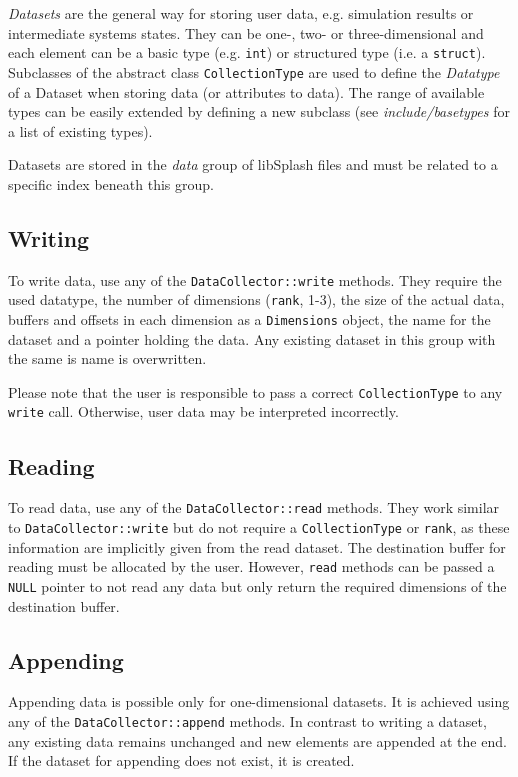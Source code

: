 \documentclass[a4paper,10pt,BCOR12mm]{report}
\begin{document}
\emph{Datasets} are the general way for storing user data, e.g. simulation results or intermediate
systems states. They can be one-, two- or three-dimensional and each element can be
a basic type (e.g. \texttt{int}) or structured type (i.e. a \texttt{struct}).
Subclasses of the abstract class \texttt{CollectionType} are used to define the
\emph{Datatype} of a Dataset when storing data (or attributes to data).
The range of available types can be easily extended by defining a new subclass
(see \emph{include/basetypes} for a list of existing types).

Datasets are stored in the \emph{data} group of libSplash files and must be
related to a specific index beneath this group.

\subsection{Writing}
\label{lab:sdc:write}

To write data, use any of the \texttt{DataCollector::write} methods.
They require the used datatype, the number
of dimensions (\texttt{rank}, 1-3), the size of the actual data, buffers and offsets in
each dimension as a \texttt{Dimensions} object, the name for the dataset and a pointer
holding the data.
Any existing dataset in this group with the same is name is overwritten.

Please note that the user is responsible to pass a correct \texttt{CollectionType} to
any \texttt{write} call. Otherwise, user data may be interpreted incorrectly.

\subsection{Reading}

To read data, use any of the \texttt{DataCollector::read} methods.
They work similar to \texttt{DataCollector::write} but do not require
a \texttt{CollectionType} or \texttt{rank}, as these information are implicitly given from
the read dataset.
The destination buffer for reading must be allocated by the user. However, \texttt{read} methods
can be passed a \texttt{NULL} pointer to not read any data but only return the required dimensions of the
destination buffer.

\subsection{Appending}

Appending data is possible only for one-dimensional datasets.
It is achieved using any of the \texttt{DataCollector::append} methods.
In contrast to writing a dataset, any existing data remains unchanged and
new elements are appended at the end.
If the dataset for appending does not exist, it is created.
\end{document}
